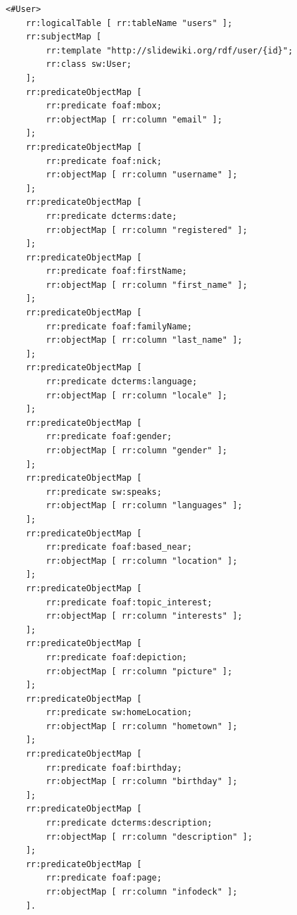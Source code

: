 \begin{lstlisting}
<#User>
    rr:logicalTable [ rr:tableName "users" ];
    rr:subjectMap [
        rr:template "http://slidewiki.org/rdf/user/{id}";
        rr:class sw:User;
    ];
    rr:predicateObjectMap [
        rr:predicate foaf:mbox;
        rr:objectMap [ rr:column "email" ];
    ];
    rr:predicateObjectMap [
        rr:predicate foaf:nick;
        rr:objectMap [ rr:column "username" ];
    ];
    rr:predicateObjectMap [
        rr:predicate dcterms:date;
        rr:objectMap [ rr:column "registered" ];
    ];
    rr:predicateObjectMap [
        rr:predicate foaf:firstName;
        rr:objectMap [ rr:column "first_name" ];
    ];
    rr:predicateObjectMap [
        rr:predicate foaf:familyName;
        rr:objectMap [ rr:column "last_name" ];
    ];
	rr:predicateObjectMap [
        rr:predicate dcterms:language;
        rr:objectMap [ rr:column "locale" ];
    ];
	rr:predicateObjectMap [
        rr:predicate foaf:gender;
        rr:objectMap [ rr:column "gender" ];
    ];
	rr:predicateObjectMap [
        rr:predicate sw:speaks;
        rr:objectMap [ rr:column "languages" ];
    ];
	rr:predicateObjectMap [
        rr:predicate foaf:based_near;
        rr:objectMap [ rr:column "location" ];
    ];
	rr:predicateObjectMap [
        rr:predicate foaf:topic_interest;
        rr:objectMap [ rr:column "interests" ];
    ];
	rr:predicateObjectMap [
        rr:predicate foaf:depiction;
        rr:objectMap [ rr:column "picture" ];
    ];
	rr:predicateObjectMap [
        rr:predicate sw:homeLocation;
        rr:objectMap [ rr:column "hometown" ];
    ];
	rr:predicateObjectMap [
        rr:predicate foaf:birthday;
        rr:objectMap [ rr:column "birthday" ];
    ];
	rr:predicateObjectMap [
        rr:predicate dcterms:description;
        rr:objectMap [ rr:column "description" ];
    ];
	rr:predicateObjectMap [
        rr:predicate foaf:page;
        rr:objectMap [ rr:column "infodeck" ];
    ].
    
\end{lstlisting}

%
%
%


